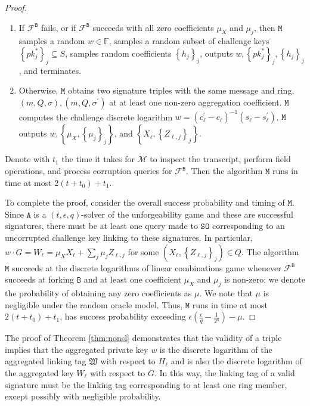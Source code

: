 \documentclass{llncs}
\begin{document}
\begin{proof}
\begin{enumerate}[(1)]
\item If $\mathcal{F}^{\texttt{B}}$ fails, or if $\mathcal{F}^{\texttt{B}}$ succeeds with all zero coefficients $\mu_X$ and $\mu_j$, then $\texttt{M}$ samples a random $w \in \mathbb{F}$, samples a random subset of challenge keys $\left\{pk^*_j\right\}_j \subseteq S$, samples random coefficients $\left\{h_j\right\}_j$, outputs $w, \left\{pk^*_j\right\}_j, \left\{h_j\right\}_j$, and terminates.

\item Otherwise, $\texttt{M}$ obtains two signature triples with the same message and ring, $(m, Q, \sigma), (m, Q, \sigma^\prime)$ at at least one non-zero aggregation coefficient. $\texttt{M}$ computes the challenge discrete logarithm $w = (c_\ell^\prime - c_\ell)^{-1}(s_\ell - s_\ell^\prime)$. $\texttt{M}$ outputs $w, \left\{\mu_X, \left\{\mu_j\right\}_j\right\}$, and $\left\{X_\ell, \left\{Z_{\ell, j}\right\}_j\right\}$.
\end{enumerate}

Denote with $t_1$ the time it takes for $\mathcal{M}$ to inspect the transcript, perform field operations, and process corruption queries for $\mathcal{F}^{\texttt{B}}$.  Then the algorithm $\texttt{M}$ runs in time at most $2(t+t_0) + t_1$.

To complete the proof, consider the overall success probability and timing of $\texttt{M}$. Since $\texttt{A}$ is a $(t, \epsilon, q)$-solver of the unforgeability game and these are successful signatures, there must be at least one query made to $\texttt{SO}$ corresponding to an uncorrupted challenge key linking to these signatures. In particular, $w \cdot G = W_\ell = \mu_X X_\ell + \sum_j \mu_j Z_{\ell,j}$ for some $(X_\ell, \left\{Z_{\ell, j}\right\}_j) \in Q$. The algorithm $\texttt{M}$ succeeds at the discrete logarithms of linear combinations game whenever $\mathcal{F}^{\texttt{B}}$ succeeds at forking $\texttt{B}$ and at least one coefficient $\mu_X$ and $\mu_j$ is non-zero; we denote the probability of obtaining any zero coefficients as $\mu$. We note that $\mu$ is negligible under the random oracle model. Thus, $\texttt{M}$ runs in time at most $2(t+t_0) + t_1$, has success probability exceeding $\epsilon\left(\frac{\epsilon}{q} - \frac{1}{2^\eta}\right) - \mu$.
\end{proof}

The proof of Theorem \ref{thm:nonsl} demonstrates that the validity of a triple implies that the aggregated private key $w$ is the discrete logarithm of the aggregated linking tag $\mathfrak{W}$ with respect to $H_\ell$ and is also the discrete logarithm of the aggregated key $W_\ell$ with respect to $G$. In this way, the linking tag of a valid signature must be the linking tag corresponding to at least one ring member, except possibly with negligible probability.
\end{document}
